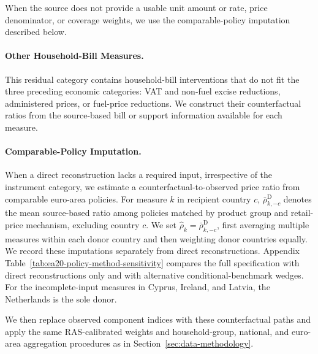 \documentclass[11pt]{article}
\begin{document}
When the source does not provide a usable unit amount or rate, price denominator, or coverage
weights, we use the comparable-policy imputation described below.


\paragraph{Other Household-Bill Measures.}
This residual category contains household-bill interventions that do not fit the three preceding
economic categories: VAT and non-fuel excise reductions, administered prices, or fuel-price
reductions. We construct their counterfactual ratios from the source-based bill or support information
available for each measure.

\paragraph{Comparable-Policy Imputation.}
When a direct reconstruction lacks a required input, irrespective of the instrument category, we
estimate a counterfactual-to-observed price ratio from comparable euro-area policies. For measure
$k$ in recipient country $c$, $\bar{\rho}^{\mathrm D}_{k,-c}$ denotes the mean source-based ratio
among policies matched by product group and retail-price mechanism, excluding country $c$. We set
$\widehat{\rho}_k=\bar{\rho}^{\mathrm D}_{k,-c}$, first averaging multiple measures within each
donor country and then weighting donor countries equally. We record these imputations separately
from direct reconstructions. Appendix Table~\ref{tab:ea20-policy-method-sensitivity} compares the
full specification with direct reconstructions only and with alternative conditional-benchmark
wedges. For the incomplete-input measures in Cyprus, Ireland, and Latvia, the Netherlands is the
sole donor.

We then replace observed component indices with these counterfactual paths and apply the same
RAS-calibrated weights and household-group, national, and euro-area aggregation procedures as in
Section~\ref{sec:data-methodology}.
\end{document}
